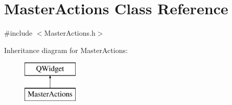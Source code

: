 \hypertarget{class_master_actions}{\section{Master\-Actions Class Reference}
\label{class_master_actions}
}


{\ttfamily \#include $<$Master\-Actions.\-h$>$}

Inheritance diagram for Master\-Actions\-:\begin{figure}[H]
\begin{center}
\leavevmode
\includegraphics[height=2.000000cm]{class_master_actions}
\end{center}
\end{figure}
